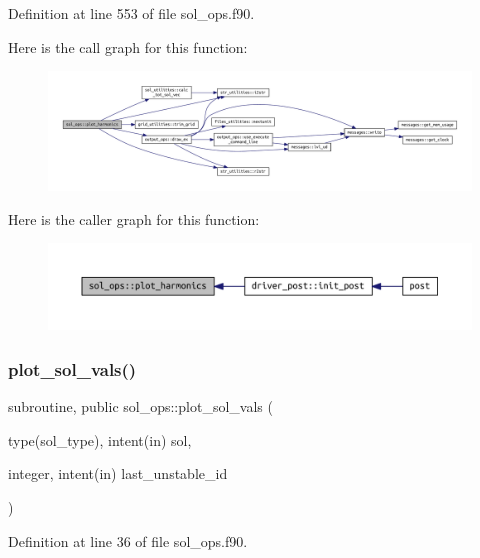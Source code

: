 Definition at line 553 of file sol\+\_\+ops.\+f90.

Here is the call graph for this function\+:
\nopagebreak
\begin{figure}[H]
\begin{center}
\leavevmode
\includegraphics[width=350pt]{namespacesol__ops_ab9a1e138cb94b547f4fd7669c677ed5c_cgraph}
\end{center}
\end{figure}
Here is the caller graph for this function\+:
\nopagebreak
\begin{figure}[H]
\begin{center}
\leavevmode
\includegraphics[width=350pt]{namespacesol__ops_ab9a1e138cb94b547f4fd7669c677ed5c_icgraph}
\end{center}
\end{figure}
\mbox{\label{namespacesol__ops_a0d4a798a56cfee9bced781d116852165}} 
\subsubsection{\texorpdfstring{plot\+\_\+sol\+\_\+vals()}{plot\_sol\_vals()}}
{\footnotesize\ttfamily subroutine, public sol\+\_\+ops\+::plot\+\_\+sol\+\_\+vals (\begin{DoxyParamCaption}\item[{type(sol\+\_\+type), intent(in)}]{sol,  }\item[{integer, intent(in)}]{last\+\_\+unstable\+\_\+id }\end{DoxyParamCaption})}



Definition at line 36 of file sol\+\_\+ops.\+f90.

